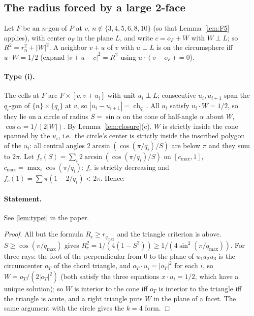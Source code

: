 \documentclass[11pt]{article}
\theoremstyle{definition}
\theoremstyle{remark}
\newcommand{\ch}{\operatorname{ch}}
\begin{document}
\subsection{The radius forced by a large 2-face}\label{sec:radii}

Let $F$ be an $n$-gon of $P$ at $v$, $n\notin\{3,4,5,6,8,10\}$ (so that
Lemma~\ref{lem:F5} applies), with center $o_F$ in the plane
$L$, and write $c=o_F+W$ with $W\perp L$; so $R^2=r_n^2+|W|^2$. A neighbor
$v+u$ of $v$ with $u\perp L$ is on the circumsphere iff $u\cdot W=1/2$
(expand $|v+u-c|^2=R^2$ using $u\cdot(v-o_F)=0$).

\paragraph{Type (i).} The cells at $F$ are $F\times[v,v+u_i]$ with unit
$u_i\perp L$; consecutive $u_i,u_{i+1}$ span the $q_i$-gon of
$\{n\}\times\{q_i\}$ at $v$, so $|u_i-u_{i+1}|=\ch_{q_i}$. All $u_i$ satisfy
$u_i\cdot W=1/2$, so they lie on a circle of radius $S=\sin\alpha$ on the
cone of half-angle $\alpha$ about $W$, $\cos\alpha=1/(2|W|)$. By
Lemma~\ref{lem:closure}(c), $W$ is strictly inside the cone spanned by the
$u_i$, i.e.\ the circle's center is strictly inside the inscribed polygon of
the $u_i$: all central angles $2\arcsin(\cos(\pi/q_i)/S)$ are below $\pi$
and they sum to $2\pi$. Let
$f_c(S)=\sum_i2\arcsin(\cos(\pi/q_i)/S)$ on $[c_{\max},1]$,
$c_{\max}=\max_i\cos(\pi/q_i)$; $f_c$ is strictly decreasing and
$f_c(1)=\sum\pi(1-2/q_i)<2\pi$. Hence:

\paragraph{Statement.} See \ref{lem:typei} in the paper.

\begin{proof}
All but the formula $R_c\ge r_{q_{\max}}$ and the triangle criterion is
above. $S\ge\cos(\pi/q_{\max})$ gives
$R_c^2=1/(4(1-S^2))\ge1/(4\sin^2(\pi/q_{\max}))$. For three rays: the foot of
the perpendicular from $0$ to the plane of $u_1u_2u_3$ is the circumcenter
$o_T$ of the chord triangle, and $o_T\cdot u_i=|o_T|^2$ for each $i$, so
$W=o_T/(2|o_T|^2)$ (both satisfy the three equations $x\cdot u_i=1/2$, which
have a unique solution); so $W$ is interior to
the cone iff $o_T$ is interior to the triangle iff the triangle is acute,
and a right triangle puts $W$ in the plane of a facet. The same argument
with the circle gives the $k=4$ form.
\end{proof}
\end{document}

